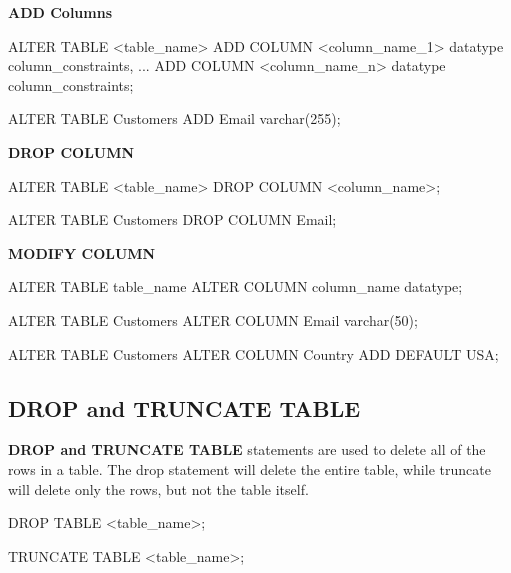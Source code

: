 \documentclass{article}
\begin{document}
\begin{large}
    \textbf{ADD Columns}
\end{large}

\begin{sqlcode}
    ALTER TABLE <table_name>
    ADD COLUMN <column_name_1> datatype column_constraints,
    ... 
    ADD COLUMN <column_name_n> datatype column_constraints;
\end{sqlcode}

\begin{sqlcode}
    ALTER TABLE Customers
    ADD Email varchar(255);
\end{sqlcode}

\begin{large}
    \textbf{DROP COLUMN}
\end{large}

\begin{sqlcode}
    ALTER TABLE <table_name>
    DROP COLUMN <column_name>;
\end{sqlcode}

\begin{sqlcode}
    ALTER TABLE Customers
    DROP COLUMN Email;
\end{sqlcode}

\begin{large}
    \textbf{MODIFY COLUMN}
\end{large}

\begin{sqlcode}
    ALTER TABLE table_name
    ALTER COLUMN column_name datatype;
\end{sqlcode}

\begin{sqlcode}
    ALTER TABLE Customers
    ALTER COLUMN Email varchar(50);
\end{sqlcode}

\begin{sqlcode}
    ALTER TABLE Customers
    ALTER COLUMN Country ADD DEFAULT USA; 
\end{sqlcode}

\subsection{DROP and TRUNCATE TABLE}

\textbf{DROP and TRUNCATE TABLE} statements are used to delete all of the rows in a table. The drop statement will delete the entire table, while truncate will delete only the rows, but not the table itself. 

\begin{sqlcode}
    DROP TABLE <table_name>;
\end{sqlcode}

\begin{sqlcode}
    TRUNCATE TABLE <table_name>;
\end{sqlcode}
\end{document}
